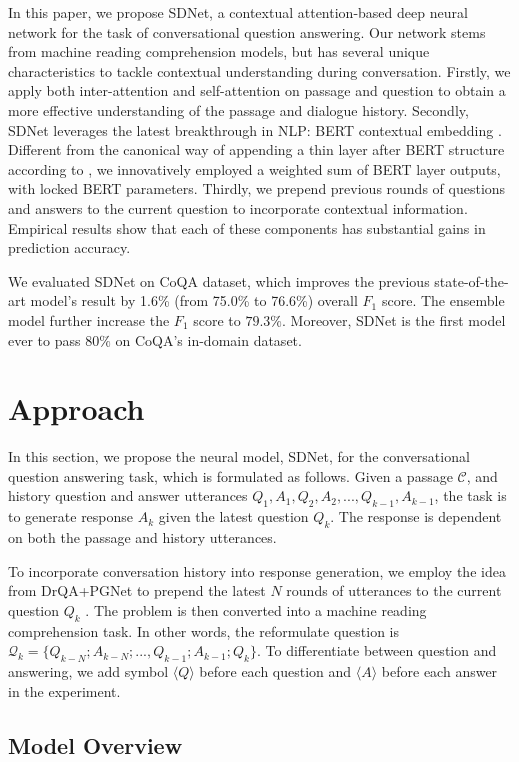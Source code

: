 \documentclass{article} \usepackage{sdnet,times}
\begin{document}
In this paper, we propose SDNet, a contextual attention-based deep neural network for the task of conversational question answering. Our network stems from machine reading comprehension models, but has several unique characteristics to tackle contextual understanding during conversation. Firstly, we apply both inter-attention and self-attention on passage and question to obtain a more effective understanding of the passage and dialogue history.
Secondly, SDNet leverages the latest breakthrough in NLP: BERT contextual embedding \citep{bert}. Different from the canonical way of appending a thin layer after BERT structure according to \citep{bert}, we innovatively employed a weighted sum of BERT layer outputs, with locked BERT parameters. Thirdly, we prepend previous rounds of questions and answers to the current question to incorporate contextual information. Empirical results show that each of these components has substantial gains in prediction accuracy.

We evaluated SDNet on CoQA dataset, which improves the previous state-of-the-art model's result by 1.6\% (from 75.0\% to 76.6\%) overall $F_1$ score. The ensemble model further increase the $F_1$ score to $79.3\%$. Moreover, SDNet is the first model ever to pass $80\%$ on CoQA's in-domain dataset. 

\section{Approach}
In this section, we propose the neural model, SDNet, for the conversational question answering task, which is formulated as follows. Given a passage $\mathcal{C}$, and history question and answer utterances $Q_1, A_1, Q_2, A_2, ..., Q_{k-1}, A_{k-1}$, the task is to generate response $A_k$ given the latest question $Q_k$. The response is dependent on both the passage and history utterances.

To incorporate conversation history into response generation, we employ the idea from DrQA+PGNet \citep{coqa} to prepend the latest $N$ rounds of utterances to the current question $Q_k$ . The problem is then converted into a machine reading comprehension task. In other words, the reformulate question is $\mathcal{Q}_k=\{Q_{k-N}; A_{k-N}; ..., Q_{k-1}; A_{k-1}; Q_k\}$. To differentiate between question and answering, we add symbol $\langle Q \rangle$ before each question and $\langle A \rangle$ before each answer in the experiment.

\subsection{Model Overview}
\end{document}
